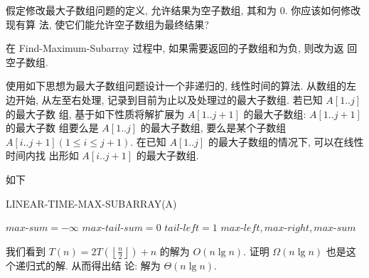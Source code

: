 \documentclass[boxes]{homework}
\begin{document}
\begin{problem}
假定修改最大子数组问题的定义, 允许结果为空子数组, 其和为 0. 你应该如何修改现有算
法, 使它们能允许空子数组为最终结果?
\end{problem}

\begin{solution}
    在 {\sc Find-Maximum-Subarray} 过程中, 如果需要返回的子数组和为负, 则改为返
    回空子数组.
\end{solution}

\begin{problem}
使用如下思想为最大子数组问题设计一个非递归的, 线性时间的算法. 从数组的左边开始,
从左至右处理, 记录到目前为止以及处理过的最大子数组. 若已知 $A[1..j]$ 的最大子数
组, 基于如下性质将解扩展为 $A[1..j + 1]$ 的最大子数组: $A[1..j + 1]$ 的最大子数
组要么是 $A[1..j]$ 的最大子数组, 要么是某个子数组 $A[i..j + 1] (1 \leqslant i
    \leqslant j + 1)$. 在已知 $A[1..j]$ 的最大子数组的情况下, 可以在线性时间内找
出形如 $A[i..j + 1]$ 的最大子数组.
\end{problem}

\begin{solution}
    如下

    \begin{algo}
        \caption{LINEAR-TIME-MAX-SUBARRAY(A)}
        \label{algo:linear-time-max-subarray}
        $max\text{-}sum = -\infty$\;
        $max\text{-}tail\text{-}sum = 0$\;
        $tail\text{-}left = 1$\;
        \Return $max\text{-}left, max\text{-}right, max\text{-}sum$\;
    \end{algo}
\end{solution}

\begin{problem}
我们看到 $T(n) = 2T \left( \left\lfloor \frac{ n }{ 2 } \right\rfloor\right) +
    n$ 的解为 $O(n\lg n)$. 证明 $\Omega(n\lg n)$ 也是这个递归式的解. 从而得出结
论: 解为 $\Theta(n\lg n)$.
\end{problem}
\end{document}
